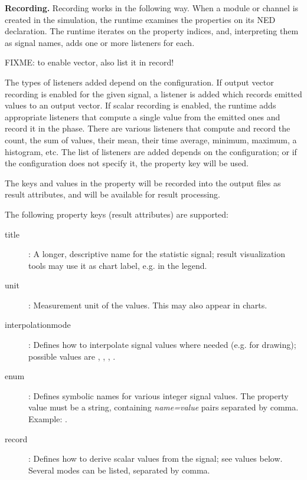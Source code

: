 \textbf{Recording.} Recording works in the following way. When a module or
channel is created in the simulation, the {\opp} runtime examines the
 properties on its NED declaration. The runtime iterates on
the property indices, and, interpreting them as signal names, adds one or
more listeners for each.

FIXME: to enable vector, also list it in record!

The types of listeners added depend on the configuration. If output vector
recording is enabled for the given signal, a listener is added which
records emitted values to an output vector. If scalar recording is enabled,
the runtime adds appropriate listeners that compute a single value from the
emitted ones and record it in the  phase. There are various
listeners that compute and record the count, the sum of values, their mean,
their time average, minimum, maximum, a histogram, etc. The list of
listeners are added depends on the configuration; or if the configuration
does not specify it, the  property key will be used.

The keys and values in the property will be recorded into the output files
as result attributes, and will be available for result processing.

The following property keys (result attributes) are supported:

\begin{description}
  \item[title]: A longer, descriptive name for the statistic signal; result
      visualization tools may use it as chart label, e.g. in the legend.
  \item[unit]: Measurement unit of the values. This may also appear in charts.
  \item[interpolationmode]: Defines how to interpolate signal values where
      needed (e.g. for drawing); possible values are ,
      , , .
  \item[enum]: Defines symbolic names for various integer signal values.
      The property value must be a string, containing \textit{name=value} pairs
      separated by comma. Example: .
  \item[record]: Defines how to derive scalar values from the signal;
     see values below. Several modes can be listed, separated by comma.
\end{description}

